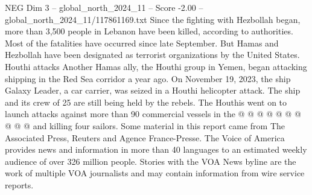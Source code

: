 \begin{textsample}{NEG Dim 3 – global\_north\_2024\_11 – Score -2.00 – global\_north\_2024\_11/117861169.txt}
Since the fighting with Hezbollah began, more than 3,500 people in Lebanon have been killed, according to authorities.
Most of the fatalities have occurred since late September.
But Hamas and Hezbollah have been designated as terrorist organizations by the United States.
Houthi attacks Another Hamas ally, the Houthi group in Yemen, began attacking shipping in the Red Sea corridor a year ago.
On November 19, 2023, the ship Galaxy Leader, a car carrier, was seized in a Houthi helicopter attack.
The ship and its crew of 25 are still being held by the rebels.
The Houthis went on to launch attacks against more than 90 commercial vessels in the @ @ @ @ @ @ @ @ @ @ and killing four sailors.
Some material in this report came from The Associated Press, Reuters and Agence France-Presse.
The Voice of America provides news and information in more than 40 languages to an estimated weekly audience of over 326 million people.
Stories with the VOA News byline are the work of multiple VOA journalists and may contain information from wire service reports.

\end{textsample}
